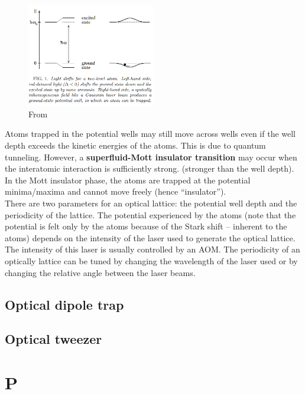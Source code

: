 \documentclass{book}
\theoremstyle{definition}
\begin{document}
\begin{figure}[!htb]
	\centering
	\includegraphics[width=0.5\textwidth]{images/dipole_trap}
	\caption{From \cite{grimm2000optical}}
\end{figure}


Atoms trapped in the potential wells may still move across wells even if the well depth exceeds the kinetic energies of the atoms. This is due to quantum tunneling. However, a \textbf{superfluid-Mott insulator transition} may occur when the interatomic interaction is sufficiently strong. (stronger than the well depth). In the Mott insulator phase, the atoms are trapped at the potential minima/maxima and cannot move freely (hence ``insulator''). \\


There are two parameters for an optical lattice: the potential well depth and the periodicity of the lattice. The potential experienced by the atoms (note that the potential is felt only by the atoms because of the Stark shift -- inherent to the atoms) depends on the intensity of the laser used to generate the optical lattice. The intensity of this laser is usually controlled by an AOM. The periodicity of an optically lattice can be tuned by changing the wavelength of the laser used or by changing the relative angle between the laser beams. 






\section*{Optical dipole trap}


\section*{Optical tweezer}


\chapter*{P}
\end{document}
